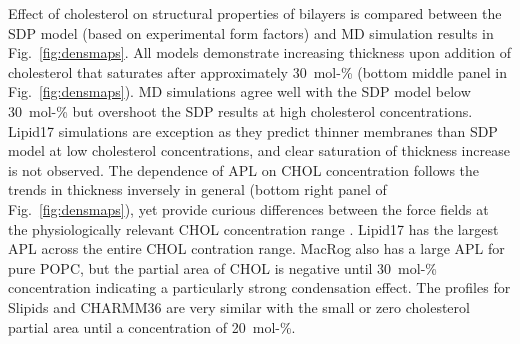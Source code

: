 \documentclass[journal=jctcce]{achemso}
\begin{document}
Effect of cholesterol on structural properties of bilayers is compared between the SDP model (based on experimental form factors) and MD simulation results in Fig.~\ref{fig:densmaps}. All models demonstrate increasing thickness upon addition of cholesterol that saturates after approximately 30~mol-\% (bottom middle panel in Fig.~\ref{fig:densmaps}). MD simulations agree well with the SDP model below 30~mol-\% but overshoot the SDP results at high cholesterol concentrations. Lipid17 simulations are exception as they predict thinner membranes than SDP model at low cholesterol concentrations, and clear saturation of thickness increase is not observed. 
%
%
The dependence of APL on CHOL concentration follows the trends in thickness inversely in general (bottom right panel of Fig.~\ref{fig:densmaps}), yet provide curious differences between the force fields at the physiologically relevant CHOL concentration range \cite{van2008membrane}. Lipid17 has the largest APL across the entire CHOL contration range.
MacRog also has a large APL for pure POPC, but the partial area of CHOL is negative until 30~mol-\% concentration indicating a particularly strong condensation effect. The profiles for Slipids and CHARMM36 are very similar with the small or zero cholesterol partial area until a concentration of 20~mol-\%. 
\end{document}
